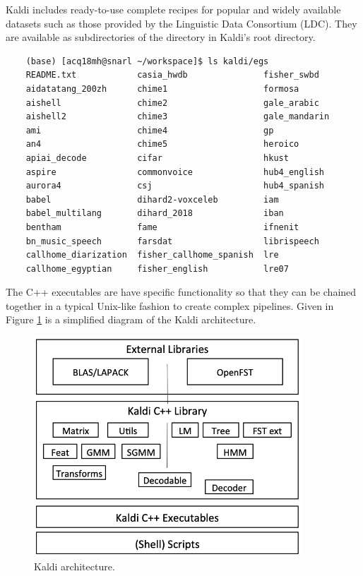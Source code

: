 	Kaldi includes ready-to-use complete recipes for popular and widely available datasets such as those provided by the Linguistic Data Consortium (LDC). They are available as subdirectories of the  directory in Kaldi's root directory.
	
	\begin{verbatim}
	(base) [acq18mh@snarl ~/workspace]$ ls kaldi/egs
	README.txt            casia_hwdb               fisher_swbd
	aidatatang_200zh      chime1                   formosa
	aishell               chime2                   gale_arabic
	aishell2              chime3                   gale_mandarin
	ami                   chime4                   gp
	an4                   chime5                   heroico
	apiai_decode          cifar                    hkust
	aspire                commonvoice              hub4_english
	aurora4               csj                      hub4_spanish
	babel                 dihard2-voxceleb         iam
	babel_multilang       dihard_2018              iban
	bentham               fame                     ifnenit
	bn_music_speech       farsdat                  librispeech
	callhome_diarization  fisher_callhome_spanish  lre
	callhome_egyptian     fisher_english           lre07
	\end{verbatim}
	
	The C++ executables are have specific functionality so that they can be chained together in a typical Unix-like fashion to create complex pipelines. Given in Figure \ref{fig:fig-kaldi} is a simplified diagram of the Kaldi architecture.
	
	\begin{figure}[t]
		\includegraphics[width=10cm]{figures/kaldi.png}
		\centering
		\caption{Kaldi architecture.}
		\label{fig:fig-kaldi}
	\end{figure}
	
